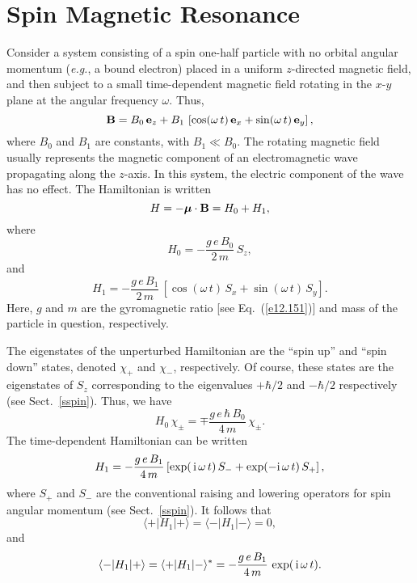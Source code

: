 \section{Spin Magnetic Resonance}
Consider a  system consisting of a spin one-half particle with no orbital
angular momentum ({\em e.g.}, a bound electron)
placed in a uniform $z$-directed magnetic field, and then subject
to  a small time-dependent magnetic field rotating in the $x$-$y$ plane at the
angular frequency $\omega$.
Thus,
\begin{equation}
{\bf B} = B_0\,{\bf e}_z + B_1\,\left[\cos(\omega\,t)\,{\bf e}_x + \sin(\omega\,t)\,{\bf e}_y\right],
\end{equation}
where $B_0$ and $B_1$ are constants, with $B_1\ll B_0$. The rotating
magnetic field usually represents the magnetic component of an electromagnetic wave propagating along the $z$-axis. In this system,
the electric component of the wave has no effect. The Hamiltonian
is written
\begin{equation}
H = -\mbox{\boldmath$\mu$}\cdot{\bf B} = H_0 + H_1,
\end{equation}
where 
\begin{equation}
H_0 = - \frac{g\,e\,B_0}{2\,m}\,S_z,
\end{equation}
and
\begin{equation}
H_1 = -\frac{g\,e\,B_1}{2\,m}\,\left[\cos(\omega\,t)\,S_x+ \sin(\omega\,t)\,S_y\right].
\end{equation}
Here, $g$ and $m$ are the gyromagnetic ratio [see Eq.~(\ref{e12.151})] and mass of the particle in question, respectively.

The eigenstates of the unperturbed Hamiltonian are the ``spin up'' and ``spin
down'' states, denoted $\chi_+$ and $\chi_-$, respectively. Of course,
these states are the eigenstates of $S_z$ corresponding to the
eigenvalues $+\hbar/2$ and $-\hbar/2$ respectively (see Sect.~\ref{sspin}).
Thus, we have
\begin{equation}
H_0\,\chi_\pm = \mp \frac{g\,e\,\hbar\,B_0}{4\,m}\,\chi_\pm.
\end{equation}
The time-dependent Hamiltonian can be written
\begin{equation}
H_1 = - \frac{g\,e\,B_1}{4\,m}\left[\exp(\,{\rm i}\,\omega\,t)\,S_- + 
\exp(-{\rm i}\,\omega\,t)\,S_+\right],
\end{equation}
where $S_+$ and $S_-$ are the conventional raising and lowering
operators for spin angular momentum (see Sect.~\ref{sspin}). It follows
that
\begin{equation}
\langle +|H_1|+\rangle = \langle -|H_1|-\rangle = 0,
\end{equation}
and
\begin{equation}
\langle -|H_1|+\rangle = \langle +|H_1|-\rangle^\ast = - \frac{g\,e\,B_1}{4\,m}\,\exp(\,{\rm i}\,\omega\,t).
\end{equation}

